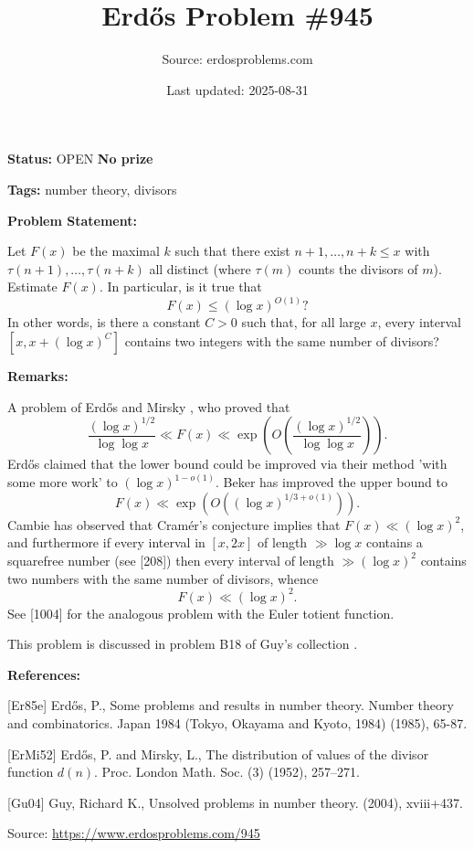 \documentclass{article}
\title{Erd\H{o}s Problem \#945}
\date{Last updated: 2025-08-31}
\author{Source: erdosproblems.com}
\begin{document}
\maketitle

\noindent\textbf{Status:} OPEN \quad \textbf{No prize}

\noindent\textbf{Tags:} number theory, divisors

\medskip
\noindent\textbf{Problem Statement:}

Let $F(x)$ be the maximal $k$ such that there exist $n+1,\ldots,n+k\leq x$ with $\tau(n+1),\ldots,\tau(n+k)$ all distinct (where $\tau(m)$ counts the divisors of $m$). Estimate $F(x)$. In particular, is it true that\[F(x) \leq (\log x)^{O(1)}?\]In other words, is there a constant $C>0$ such that, for all large $x$, every interval $[x,x+(\log x)^C]$ contains two integers with the same number of divisors?

\bigskip
\noindent\textbf{Remarks:}

A problem of Erd\H{o}s and Mirsky \cite{ErMi52}, who proved that\[\frac{(\log x)^{1/2}}{\log\log x}\ll F(x) \ll \exp\left(O\left(\frac{(\log x)^{1/2}}{\log\log x}\right)\right).\]Erd\H{o}s \cite{Er85e} claimed that the lower bound could be improved via their method 'with some more work' to $(\log x)^{1-o(1)}$. Beker has improved the upper bound to\[F(x) \ll \exp\left(O\left((\log x)^{1/3+o(1)}\right)\right).\]Cambie has observed that Cram\'{er's conjecture} implies that $F(x) \ll (\log x)^2$, and furthermore if every interval in $[x,2x]$ of length $\gg \log x$ contains a squarefree number (see [208]) then every interval of length $\gg (\log x)^2$ contains two numbers with the same number of divisors, whence\[F(x) \ll (\log x)^2.\]See [1004] for the analogous problem with the Euler totient function.

This problem is discussed in problem B18 of Guy's collection \cite{Gu04}.

\bigskip
\noindent\textbf{References:}

[Er85e] Erd\H{o}s, P., Some problems and results in number theory. Number theory and combinatorics. Japan 1984 (Tokyo,
Okayama and Kyoto, 1984) (1985), 65-87.
 
 [ErMi52] Erd\H{o}s, P. and Mirsky, L., The distribution of values of the divisor function {$d(n)$}. Proc. London Math. Soc. (3) (1952), 257--271.
 
 [Gu04] Guy, Richard K., Unsolved problems in number theory. (2004), xviii+437.

\bigskip
\noindent\small{Source: \url{https://www.erdosproblems.com/945}}
\end{document}

